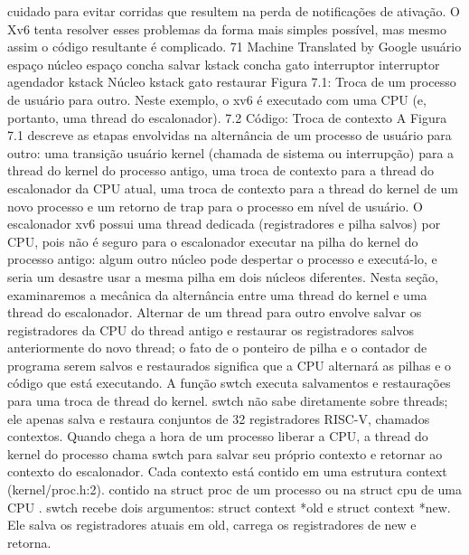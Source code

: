 cuidado  para  evitar  corridas  que  resultem  na  perda  de  notificações  de  ativação.  O  Xv6  tenta  resolver  esses  problemas  
da  forma  mais  simples  possível,  mas  mesmo  assim  o  código  resultante  é  complicado.
 71
Machine Translated by Google
 usuário
 espaço
 núcleo
 espaço
 concha
 salvar
 kstack
 concha
 gato
 interruptor
 interruptor
 agendador  
kstack
 Núcleo
 kstack
 gato
 restaurar
 Figura  7.1:  Troca  de  um  processo  de  usuário  para  outro.  Neste  exemplo,  o  xv6  é  executado  com  uma  CPU  (e,  portanto,  
uma  thread  do  escalonador).
 7.2  Código:  Troca  de  contexto
 A  Figura  7.1  descreve  as  etapas  envolvidas  na  alternância  de  um  processo  de  usuário  para  outro:  uma  transição  usuário
kernel  (chamada  de  sistema  ou  interrupção)  para  a  thread  do  kernel  do  processo  antigo,  uma  troca  de  contexto  para  a  
thread  do  escalonador  da  CPU  atual,  uma  troca  de  contexto  para  a  thread  do  kernel  de  um  novo  processo  e  um  retorno  
de  trap  para  o  processo  em  nível  de  usuário.  O  escalonador  xv6  possui  uma  thread  dedicada  (registradores  e  pilha  salvos)  
por  CPU,  pois  não  é  seguro  para  o  escalonador  executar  na  pilha  do  kernel  do  processo  antigo:  algum  outro  núcleo  pode  
despertar  o  processo  e  executá-lo,  e  seria  um  desastre  usar  a  mesma  pilha  em  dois  núcleos  diferentes.  Nesta  seção,  
examinaremos  a  mecânica  da  alternância  entre  uma  thread  do  kernel  e  uma  thread  do  escalonador.
 Alternar  de  um  thread  para  outro  envolve  salvar  os  registradores  da  CPU  do  thread  antigo  e  restaurar  os  registradores  
salvos  anteriormente  do  novo  thread;  o  fato  de  o  ponteiro  de  pilha  e  o  contador  de  programa  serem  salvos  e  restaurados  
significa  que  a  CPU  alternará  as  pilhas  e  o  código  que  está  executando.
 A  função  swtch  executa  salvamentos  e  restaurações  para  uma  troca  de  thread  do  kernel.  swtch  não  sabe  diretamente  
sobre  threads;  ele  apenas  salva  e  restaura  conjuntos  de  32  registradores  RISC-V,  chamados  contextos.
 Quando  chega  a  hora  de  um  processo  liberar  a  CPU,  a  thread  do  kernel  do  processo  chama  swtch  para  salvar  seu  próprio  
contexto  e  retornar  ao  contexto  do  escalonador.  Cada  contexto  está  contido  em  uma  estrutura  context  (kernel/proc.h:2).  
contido  na  struct  proc  de  um  processo  ou  na  struct  cpu  de  uma  CPU .  swtch  recebe  dois  argumentos:  struct  context  *old  e  
struct  context  *new.  Ele  salva  os  registradores  atuais  em  old,  carrega  os  registradores  de  new  e  retorna.
